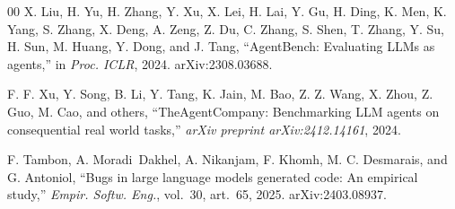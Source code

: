 \documentclass{ieeeaccess}
\begin{document}
\begin{thebibliography}{00}
 X. Liu, H. Yu, H. Zhang, Y. Xu, X. Lei, H. Lai, Y. Gu, H. Ding, K. Men, K. Yang, S. Zhang, X. Deng, A. Zeng, Z. Du, C. Zhang, S. Shen, T. Zhang, Y. Su, H. Sun, M. Huang, Y. Dong, and J. Tang, ``AgentBench: Evaluating LLMs as agents,'' in \textit{Proc. ICLR}, 2024. arXiv:2308.03688.

 F. F. Xu, Y. Song, B. Li, Y. Tang, K. Jain, M. Bao, Z. Z. Wang, X. Zhou, Z. Guo, M. Cao, and others, ``TheAgentCompany: Benchmarking LLM agents on consequential real world tasks,'' \textit{arXiv preprint arXiv:2412.14161}, 2024.

 F. Tambon, A. Moradi~Dakhel, A. Nikanjam, F. Khomh, M. C. Desmarais, and G. Antoniol, ``Bugs in large language models generated code: An empirical study,'' \textit{Empir. Softw. Eng.}, vol.~30, art.~65, 2025. arXiv:2403.08937.

\end{thebibliography}
\end{document}
